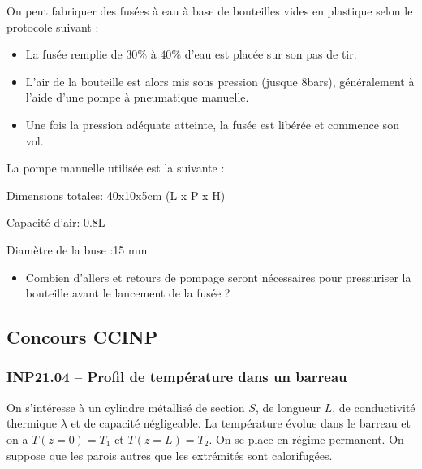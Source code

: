 On peut fabriquer des fusées à eau à base de bouteilles vides en plastique selon le protocole suivant :
\begin{itemize}
\item	La fusée remplie de $30\%$ à $40\%$ d'eau est placée sur son pas de tir.
\item	L'air de la bouteille est alors mis sous pression (jusque 8bars), généralement à l'aide d'une pompe à pneumatique manuelle.
\item Une fois la pression adéquate atteinte, la fusée est libérée et commence son vol.
\end{itemize}

La pompe manuelle utilisée est la suivante :

\begin{center}
\end{center}

Dimensions totales: 40x10x5cm (L x P x H)

Capacité d'air: 0.8L

Diamètre de la buse :15 mm	 

\begin{itemize}[label=\textbullet]
\item Combien d’allers et retours de pompage seront nécessaires pour pressuriser la bouteille avant le lancement de la fusée ?
\end{itemize}

\subsection*{Concours CCINP}
\subsubsection*{INP21.04 -- Profil de température dans un barreau }

\begin{center}
\end{center}

On s'intéresse à un cylindre métallisé de section $S$, de longueur $L$, de conductivité thermique $\lambda$ et de capacité négligeable. La température évolue dans le barreau et on a $T(z = 0) = T_{1}$ et $T(z = L) = T_{2}$. On se place en régime permanent. On suppose que les parois autres que les extrémités sont calorifugées.

